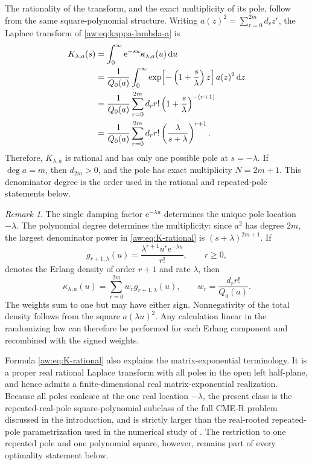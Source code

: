 \documentclass[11pt]{article}
\numberwithin{equation}{section}
\theoremstyle{definition}
\theoremstyle{remark}
\newtheorem{remark}[theorem]{Remark}
\newcommand{\dd}{\,\mathrm d}
\newcommand{\e}{\mathrm e}
\begin{document}
The rationality of the transform, and the exact multiplicity of its pole,
follow from the same square-polynomial structure. Writing $a(z)^2=\sum_{r=0}^{2m}d_rz^r$,
the Laplace transform of \eqref{aw:eq:kappa-lambda-a} is
\begin{align}
    K_{\lambda,a}(s)
    &=\int_0^\infty\e^{-su}\kappa_{\lambda,a}(u)\dd u\notag\\
    &=\frac1{Q_0(a)}
      \int_0^\infty
      \exp\!\left[-\left(1+\frac{s}{\lambda}\right)z\right]
      a(z)^2\dd z\notag\\
    &=\frac1{Q_0(a)}
      \sum_{r=0}^{2m}d_rr!
      \left(1+\frac{s}{\lambda}\right)^{-(r+1)}\notag\\
    &=\frac1{Q_0(a)}
      \sum_{r=0}^{2m}d_rr!
      \left(\frac{\lambda}{s+\lambda}\right)^{r+1}.
      \label{aw:eq:K-rational}
\end{align}
Therefore, $K_{\lambda,a}$ is rational and has only one possible pole at
$s=-\lambda$. If $\deg a=m$, then $d_{2m}>0$, and the pole has exact
multiplicity $N=2m+1$. This denominator degree is the order used in the rational and
repeated-pole statements below.


\begin{remark}
\label{aw:rem:confluent}
The single damping factor $\e^{-\lambda u}$ determines the unique pole
location $-\lambda$. The polynomial degree determines the multiplicity: since
$a^2$ has degree $2m$, the largest denominator power in
\eqref{aw:eq:K-rational} is $(s+\lambda)^{2m+1}$. If
\[
 g_{r+1,\lambda}(u)
 =\frac{\lambda^{r+1}u^r\e^{-\lambda u}}{r!},
 \qquad r\geq0,
\]
denotes the Erlang density of order $r+1$ and rate $\lambda$, then
\begin{equation*}
 \kappa_{\lambda,a}(u)
 =\sum_{r=0}^{2m}w_r g_{r+1,\lambda}(u),
 \qquad
 w_r=\frac{d_r r!}{Q_0(a)}.
\end{equation*}
The weights sum to one but may have either sign. Nonnegativity of the total
density follows from the square $a(\lambda u)^2$. Any calculation linear in
the randomizing law can therefore be performed for each Erlang component and
recombined with the signed weights.
\end{remark}

Formula \eqref{aw:eq:K-rational} also explains the matrix-exponential
terminology. It is a proper real rational Laplace transform with all poles
in the open left half-plane, and hence admits a finite-dimensional real
matrix-exponential realization. Because all poles coalesce at the one real
location $-\lambda$, the present class is the repeated-real-pole
square-polynomial subclass of the full CME-R problem discussed in the
introduction, and is strictly larger than the real-rooted repeated-pole
parametrization used in the numerical study of \cite{meszarostelek2022}.
The restriction to one repeated pole and one polynomial square, however,
remains part of every optimality statement below.
\end{document}

